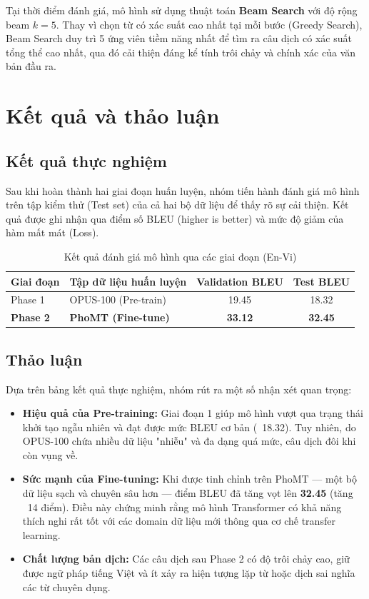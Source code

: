 \documentclass[a4paper,12pt,twoside]{report}
\begin{document}
Tại thời điểm đánh giá, mô hình sử dụng thuật toán \textbf{Beam Search} với độ rộng beam $k=5$. Thay vì chọn từ có xác suất cao nhất tại mỗi bước (Greedy Search), Beam Search duy trì 5 ứng viên tiềm năng nhất để tìm ra câu dịch có xác suất tổng thể cao nhất, qua đó cải thiện đáng kể tính trôi chảy và chính xác của văn bản đầu ra.

\chapter{Kết quả và thảo luận}

\section{Kết quả thực nghiệm}
Sau khi hoàn thành hai giai đoạn huấn luyện, nhóm tiến hành đánh giá mô hình trên tập kiểm thử (Test set) của cả hai bộ dữ liệu để thấy rõ sự cải thiện. Kết quả được ghi nhận qua điểm số BLEU (higher is better) và mức độ giảm của hàm mất mát (Loss).

\begin{table}[H]
\centering
\caption{Kết quả đánh giá mô hình qua các giai đoạn (En-Vi)}
\label{tab:results}
\begin{tabular}{|l|l|c|c|}
\hline
\textbf{Giai đoạn} & \textbf{Tập dữ liệu huấn luyện} & \textbf{Validation BLEU} & \textbf{Test BLEU} \\ \hline
Phase 1 & OPUS-100 (Pre-train) & 19.45 & 18.32 \\ \hline
\textbf{Phase 2} & \textbf{PhoMT (Fine-tune)} & \textbf{33.12} & \textbf{32.45} \\ \hline
\end{tabular}
\end{table}

\section{Thảo luận}
Dựa trên bảng kết quả thực nghiệm, nhóm rút ra một số nhận xét quan trọng:
\begin{itemize}
    \item \textbf{Hiệu quả của Pre-training:} Giai đoạn 1 giúp mô hình vượt qua trạng thái khởi tạo ngẫu nhiên và đạt được mức BLEU cơ bản (~18.32). Tuy nhiên, do OPUS-100 chứa nhiều dữ liệu "nhiễu" và đa dạng quá mức, câu dịch đôi khi còn vụng về.
    \item \textbf{Sức mạnh của Fine-tuning:} Khi được tinh chỉnh trên PhoMT — một bộ dữ liệu sạch và chuyên sâu hơn — điểm BLEU đã tăng vọt lên \textbf{32.45} (tăng ~14 điểm). Điều này chứng minh rằng mô hình Transformer có khả năng thích nghi rất tốt với các domain dữ liệu mới thông qua cơ chế transfer learning.
    \item \textbf{Chất lượng bản dịch:} Các câu dịch sau Phase 2 có độ trôi chảy cao, giữ được ngữ pháp tiếng Việt và ít xảy ra hiện tượng lặp từ hoặc dịch sai nghĩa các từ chuyên dụng.
\end{itemize}
\end{document}
